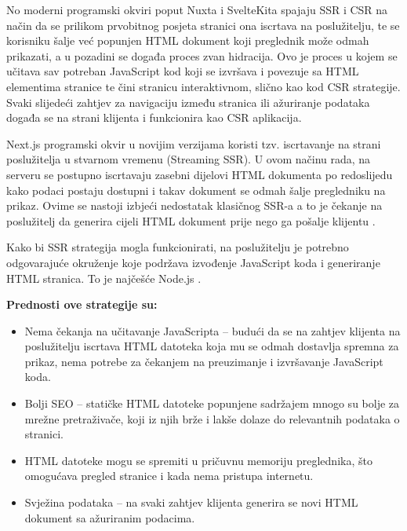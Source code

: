 \bigskip

No moderni programski okviri poput Nuxta i SvelteKita spajaju SSR i CSR na način da se prilikom prvobitnog posjeta stranici ona iscrtava na poslužitelju, te se korisniku šalje već popunjen HTML dokument koji preglednik može odmah prikazati, a u pozadini se događa proces zvan hidracija. Ovo je proces u kojem se učitava sav potreban JavaScript kod koji se izvršava i povezuje sa HTML elementima stranice te čini stranicu interaktivnom, slično kao kod CSR strategije. Svaki slijedeći zahtjev za navigaciju između stranica ili ažuriranje podataka događa se na strani klijenta i funkcionira kao CSR aplikacija.

\bigskip

Next.js programski okvir u novijim verzijama koristi tzv. iscrtavanje na strani poslužitelja u stvarnom vremenu (Streaming SSR). U ovom načinu rada, na serveru se postupno iscrtavaju zasebni dijelovi HTML dokumenta po redoslijedu kako podaci postaju dostupni i takav dokument se odmah šalje pregledniku na prikaz. Ovime se nastoji izbjeći nedostatak klasičnog SSR-a a to je čekanje na poslužitelj da generira cijeli HTML dokument prije nego ga pošalje klijentu \cite{nextjsloading}.

\bigskip

Kako bi SSR strategija mogla funkcionirati, na poslužitelju je potrebno odgovarajuće okruženje koje podržava izvođenje JavaScript koda i generiranje HTML stranica. To je najčešće Node.js \cite{vuejsssr}.

\bigskip

\textbf{Prednosti ove strategije su:}

\begin{itemize}
    \item Nema čekanja na učitavanje JavaScripta – budući da se na zahtjev klijenta na poslužitelju iscrtava HTML datoteka koja mu se odmah dostavlja spremna za prikaz, nema potrebe za čekanjem na preuzimanje i izvršavanje JavaScript koda.
    \item Bolji SEO – statičke HTML datoteke popunjene sadržajem mnogo su bolje za mrežne pretraživače, koji iz njih brže i lakše dolaze do relevantnih podataka o stranici.
    \item HTML datoteke mogu se spremiti u pričuvnu memoriju preglednika, što omogućava pregled stranice i kada nema pristupa internetu.
    \item Svježina podataka – na svaki zahtjev klijenta generira se novi HTML dokument sa ažuriranim podacima.
\end{itemize}

